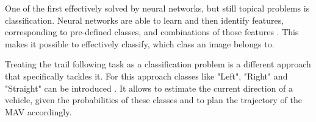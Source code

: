 One of the first effectively solved by neural networks, but still topical problems is classification. Neural networks are able to learn and then identify features, corresponding to pre-defined classes, and combinations of those features \cite{krizhevsky2012imagenet}. This makes it possible to effectively classify, which class an image belongs to. 

Treating the trail following task as a classification problem is a different approach that specifically tackles it. For this approach classes like "Left", "Right" and "Straight" can be introduced \cite{giusti2016machine}. It allows to estimate the current direction of a vehicle, given the probabilities of these classes and to plan the trajectory of the \acs{MAV} accordingly. 


\begin{figure}[!h]
  \begin{minipage}{.5\linewidth}
  \centering
  \end{minipage}
  \begin{minipage}{.5\linewidth}
  \centering	
  


\end{minipage}
\end{figure}
